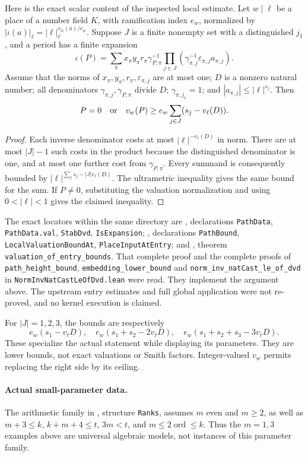 \documentclass[11pt,a4paper]{article}
\theoremstyle{remark}
\begin{document}
Here is the exact scalar content of the inspected local estimate.  Let
$w\mid\ell$ be a place of a number field $K$, with ramification index
$e_w$, normalized by
$|\iota(a)|_\ell=|\ell|_\ell^{v_w(a)/e_w}$.  Suppose $J$ is a finite
nonempty set with a distinguished $j_1$, and a period has a finite expansion
\[
 \iota(P)=\sum_\pi x_\pi y_\pi r_\pi\gamma_{P,\pi}^{-1}
        \prod_{j\in J}
          (\gamma_{\pi,j}^{-1}\varepsilon_{\pi,j}a_{\pi,j}).
\]
Assume that the norms of $x_\pi,y_\pi,r_\pi,\varepsilon_{\pi,j}$ are
at most one; $D$ is a nonzero natural number; all denominators
$\gamma_{\pi,j},\gamma_{P,\pi}$ divide $D$;
$\gamma_{\pi,j_1}=1$; and $|a_{\pi,j}|\le|\ell|^{s_j}$.  Then
\[
 P=0\quad\hbox{or}\quad
 v_w(P)\ge e_w\sum_{j\in J}(s_j-v_\ell(D)).
\]
\begin{proof}
Each inverse denominator costs at most $|\ell|^{-v_\ell(D)}$ in norm.
There are at most $|J|-1$ such costs in the product because the distinguished
denominator is one, and at most one further cost from $\gamma_{P,\pi}$.
Every summand is consequently bounded by
$|\ell|^{\sum_js_j-|J|v_\ell(D)}$.  The ultrametric inequality gives
the same bound for the sum.  If $P\ne0$, substituting the valuation
normalization and using $0<|\ell|<1$ gives the claimed inequality.
\end{proof}

The exact locators within the same directory are
, declarations
\texttt{PathData}, \texttt{PathData.val}, \texttt{StabDvd},
\texttt{IsExpansion}; , declarations
\texttt{PathBound}, \texttt{LocalValuationBoundAt},
\texttt{PlaceInputAtEntry}; and
, theorem
\texttt{valuation\_of\_entry\_bounds}.  That complete proof and the
complete proofs of \texttt{path\_height\_bound},
\texttt{embedding\_lower\_bound} and
\texttt{norm\_inv\_natCast\_le\_of\_dvd} in
\texttt{NormInvNatCastLeOfDvd.lean} were read.  They implement the
argument above.  The upstream entry estimates and full global application
were not re-proved, and no kernel execution is claimed.

For $|J|=1,2,3$, the bounds are respectively
\[
 e_w(s_1-v_\ell D),\quad
 e_w(s_1+s_2-2v_\ell D),\quad
 e_w(s_1+s_2+s_3-3v_\ell D).
\]
These specialize the actual statement while displaying its parameters.
They are lower bounds, not exact valuations or Smith factors.  Integer-valued
$v_w$ permits replacing the right side by its ceiling.

\paragraph{Actual small-parameter data.}
The arithmetic family in
, structure
\texttt{Ranks}, assumes $m$ even and $m\ge2$, as well as
$m+3\le k$, $k+m+4\le t$, $3m<t$, and
$m\le2\operatorname{ord}\le k$.  Thus the $m=1,3$ examples above are
universal algebraic models, not instances of this parameter family.
\end{document}
